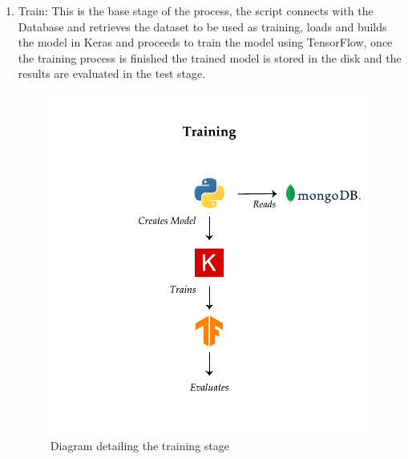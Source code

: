\begin{itemize}
\begin{enumerate}
        \item Train: This is the base stage of the process, the script connects with the Database and retrieves the dataset to be used as training, loads and builds the model in Keras and proceeds to train the model using TensorFlow, once the training process is finished the trained model is stored in the disk and the results are evaluated in the test stage.
        \begin{figure}[th]
            \centering
            \includegraphics{Figures/TrainStage}
            \decoRule
            \caption[Train Stage]{Diagram detailing the training stage}
            \label{fig:Train Stage}
        \end{figure}
        

\end{enumerate}
\end{itemize}
